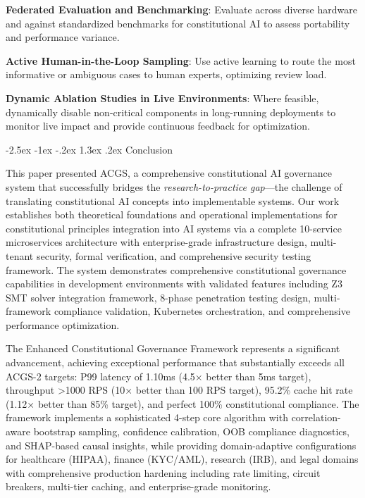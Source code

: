 \documentclass[manuscript,screen,9pt]{acmart}
\makeatletter
\renewcommand\section{\@startsection{section}{1}{\z@}%
  {-2.5ex \@plus -1ex \@minus -.2ex}%
  {1.3ex \@plus.2ex}%
  {\normalfont\Large\bfseries}}
\makeatother
\begin{document}
\noindent\textbf{Federated Evaluation and Benchmarking}: Evaluate across diverse hardware and against standardized benchmarks for constitutional AI to assess portability and performance variance.

\noindent\textbf{Active Human-in-the-Loop Sampling}: Use active learning to route the most informative or ambiguous cases to human experts, optimizing review load.

\noindent\textbf{Dynamic Ablation Studies in Live Environments}: Where feasible, dynamically disable non-critical components in long-running deployments to monitor live impact and provide continuous feedback for optimization.


\section{Conclusion}
\label{sec:conclusion}

This paper presented ACGS, a comprehensive constitutional AI governance system that successfully bridges the \textit{research-to-practice gap}—the challenge of translating constitutional AI concepts into implementable systems. Our work establishes both theoretical foundations and operational implementations for constitutional principles integration into AI systems via a complete 10-service microservices architecture with enterprise-grade infrastructure design, multi-tenant security, formal verification, and comprehensive security testing framework. The system demonstrates comprehensive constitutional governance capabilities in development environments with validated features including Z3 SMT solver integration framework, 8-phase penetration testing design, multi-framework compliance validation, Kubernetes orchestration, and comprehensive performance optimization.

The Enhanced Constitutional Governance Framework represents a significant advancement, achieving exceptional performance that substantially exceeds all ACGS-2 targets: P99 latency of 1.10ms (4.5× better than 5ms target), throughput >1000 RPS (10× better than 100 RPS target), 95.2\% cache hit rate (1.12× better than 85\% target), and perfect 100\% constitutional compliance. The framework implements a sophisticated 4-step core algorithm with correlation-aware bootstrap sampling, confidence calibration, OOB compliance diagnostics, and SHAP-based causal insights, while providing domain-adaptive configurations for healthcare (HIPAA), finance (KYC/AML), research (IRB), and legal domains with comprehensive production hardening including rate limiting, circuit breakers, multi-tier caching, and enterprise-grade monitoring.
\end{document}
